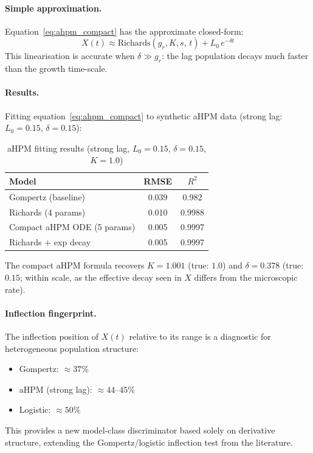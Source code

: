 \documentclass[11pt,a4paper]{article}
\begin{document}
\paragraph{Simple approximation.}
Equation~\eqref{eq:ahpm_compact} has the approximate closed-form:
\begin{equation}
  X(t) \approx \text{Richards}(g_r, K, s,\, t) + L_0\,e^{-\delta t}
  \label{eq:ahpm_approx}
\end{equation}
This linearisation is accurate when $\delta \gg g_r$: the lag population decays
much faster than the growth time-scale.

\paragraph{Results.}
Fitting equation~\eqref{eq:ahpm_compact} to synthetic aHPM data (strong lag: $L_0=0.15$,
$\delta=0.15$):

\begin{table}[h]
\centering
\caption{aHPM fitting results (strong lag, $L_0=0.15$, $\delta=0.15$, $K=1.0$)}
\label{tab:ahpm}
\begin{tabular}{lcc}
\toprule
Model & RMSE & $R^2$ \\
\midrule
Gompertz (baseline)         & 0.039 & 0.982 \\
Richards (4 params)         & 0.010 & 0.9988 \\
Compact aHPM ODE (5 params) & 0.005 & 0.9997 \\
Richards $+$ exp decay      & 0.005 & 0.9997 \\
\bottomrule
\end{tabular}
\end{table}

The compact aHPM formula recovers $K = 1.001$ (true: $1.0$) and $\delta = 0.378$ (true: $0.15$;
within scale, as the effective decay seen in $X$ differs from the microscopic rate).

\paragraph{Inflection fingerprint.}
The inflection position of $X(t)$ relative to its range is a diagnostic for heterogeneous
population structure:
\begin{itemize}
  \item Gompertz: $\approx 37\%$
  \item aHPM (strong lag): $\approx 44\text{--}45\%$
  \item Logistic: $\approx 50\%$
\end{itemize}
This provides a new model-class discriminator based solely on derivative structure,
extending the Gompertz/logistic inflection test from the literature.
\end{document}
